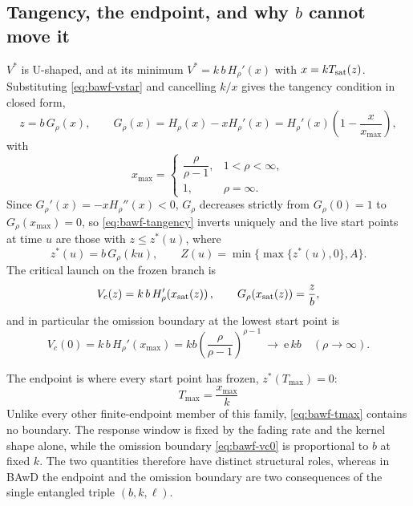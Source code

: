 \documentclass[12pt]{article}
\newcommand{\e}{\mathrm{e}}
\theoremstyle{remark}
\begin{document}
\subsection{Tangency, the endpoint, and why $b$ cannot move it}
\label{sec:bawf-endpoint}
$V^{*}$ is U-shaped, and at its minimum $V^{*}=k\,b\,H_\rho'(x)$ with $x=kT_{\rm sat}(z)$. Substituting
\eqref{eq:bawf-vstar} and cancelling $k/x$ gives the tangency condition in
closed form,
\begin{equation}
  z = b\,G_\rho(x),
  \qquad
  G_\rho(x) = H_\rho(x) - x H_\rho'(x)
            = H_\rho'(x)\left(1 - \frac{x}{x_{\max}}\right),
  \label{eq:bawf-tangency}
\end{equation}
with
\begin{equation}
  x_{\max} =
  \begin{cases}
    \dfrac{\rho}{\rho-1}, & 1<\rho<\infty,\\[6pt]
    1, & \rho=\infty.
  \end{cases}
  \label{eq:bawf-xmax}
\end{equation}
Since $G_\rho'(x) = -xH_\rho''(x) < 0$, $G_\rho$ decreases strictly from $G_\rho(0)=1$ to $G_\rho(x_{\max})=0$, so \eqref{eq:bawf-tangency} inverts uniquely and the live start points at time $u$ are those with $z\le z^{*}(u)$, where
\begin{equation}
  z^{*}(u) = b\,G_\rho(ku),
  \qquad
  Z(u) = \min\{\max\{z^{*}(u),0\},A\}.
  \label{eq:bawf-Z}
\end{equation}
The critical launch on the frozen branch is
\begin{equation}
  V_c(z) = k\,b\,H_\rho'\!\left(x_{\rm sat}(z)\right),
  \qquad
  G_\rho\!\left(x_{\rm sat}(z)\right) = \frac{z}{b},
  \label{eq:bawf-crit}
\end{equation}
and in particular the omission boundary at the lowest start point is
\begin{equation}
  V_c(0) = k\,b\,H_\rho'(x_{\max})
  = k b \left(\frac{\rho}{\rho-1}\right)^{\rho-1}
  \ \longrightarrow\ \e\,kb \quad (\rho\to\infty).
  \label{eq:bawf-vc0}
\end{equation}

The endpoint is where every start point has frozen, $z^{*}(T_{\max})=0$:
\begin{equation}
  \boxed{\ T_{\max} = \frac{x_{\max}}{k}\ }
  \label{eq:bawf-tmax}
\end{equation}
Unlike every other finite-endpoint member of this family,
\eqref{eq:bawf-tmax} contains no boundary. The response window is fixed by the
fading rate and the kernel shape alone, while the omission boundary
\eqref{eq:bawf-vc0} is proportional to $b$ at fixed $k$. The two
quantities therefore have distinct structural roles, whereas in BAwD the endpoint and the omission boundary are two consequences of the single entangled triple $(b,k,\ell)$.
\end{document}
